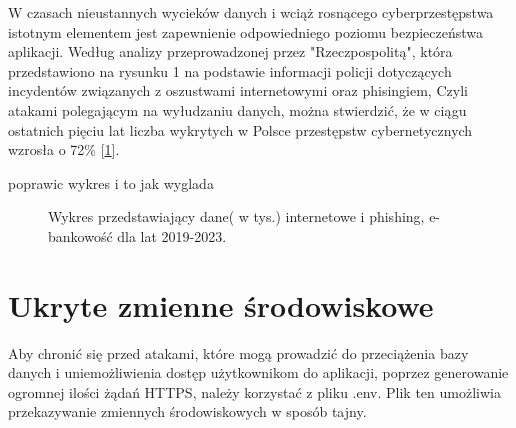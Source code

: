 W czasach nieustannych wycieków danych i wciąż rosnącego cyberprzestępstwa istotnym elementem jest zapewnienie odpowiedniego poziomu bezpieczeństwa aplikacji. Według analizy przeprowadzonej przez "Rzeczpospolitą", która przedstawiono na rysunku 1 na podstawie informacji policji dotyczących incydentów związanych z oszustwami internetowymi oraz phisingiem, Czyli atakami polegającym na wyłudzaniu danych, \cite{phishing}  można stwierdzić, że w ciągu ostatnich pięciu lat liczba wykrytych w Polsce przestępstw cybernetycznych wzrosła o 72\% \cite{wykresbezpieczenstwo} [\ref{fig:Wykres}].

poprawic wykres i to jak wyglada
\begin{figure}[h]
	\centering
	\caption{Wykres przedstawiający dane( w tys.) internetowe i phishing, e-bankowość dla lat 2019-2023.}
	\label{fig:Wykres}
\end{figure}

\section*{Ukryte zmienne środowiskowe}

Aby chronić się przed atakami, które mogą prowadzić do przeciążenia bazy danych i uniemożliwienia dostęp użytkownikom do aplikacji, poprzez generowanie ogromnej ilości żądań HTTPS, należy korzystać z pliku .env. Plik ten umożliwia przekazywanie zmiennych środowiskowych w sposób tajny.

